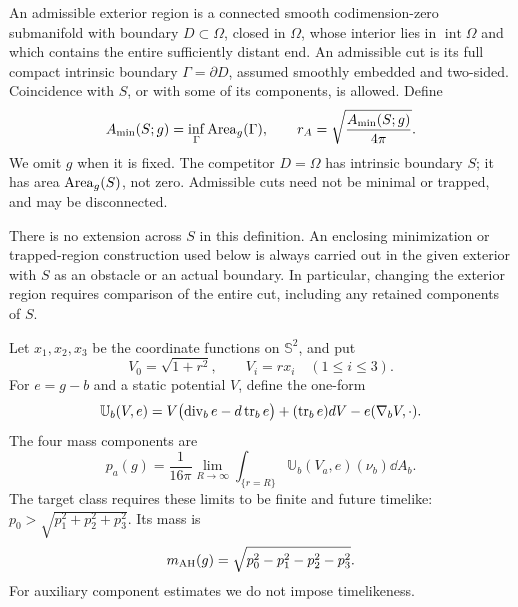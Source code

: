 \begin{definition}\label{def:setup-cut}
An admissible exterior region is a connected smooth codimension-zero
submanifold with boundary $D\subset\Omega$, closed in $\Omega$, whose
interior lies in $\operatorname{int}\Omega$ and which contains the entire
sufficiently distant end. An admissible cut is its full compact intrinsic
boundary $\Gamma=\partial D$, assumed smoothly embedded and two-sided.
Coincidence with $S$, or with some of its components, is allowed. Define
\begin{equation}\label{eq:setup-area}
 A_{\min}(S;g)=\inf_{\Gamma}\operatorname{Area}_g(\Gamma),
 \qquad r_A=\sqrt{\frac{A_{\min}(S;g)}{4\pi}}.
\end{equation}
We omit $g$ when it is fixed. The competitor $D=\Omega$ has intrinsic
boundary $S$; it has area $\operatorname{Area}_g(S)$, not zero. Admissible cuts need not be
minimal or trapped, and may be disconnected.
\end{definition}

There is no extension across $S$ in this definition. An enclosing
minimization or trapped-region construction used below is always carried
out in the given exterior with $S$ as an obstacle or an actual boundary.
In particular, changing the exterior region requires comparison of the
entire cut, including any retained components of $S$.

\begin{definition}\label{def:setup-mass}
Let $x_1,x_2,x_3$ be the coordinate functions on $\mathbb S^2$, and put
\begin{equation}\label{eq:setup-potentials}
 V_0=\sqrt{1+r^2},\qquad V_i=rx_i\quad(1\le i\le3).
\end{equation}
For $e=g-b$ and a static potential $V$, define the one-form
\begin{equation}\label{eq:setup-flux-form}
 \mathbb U_b(V,e)
 =V\bigl(\operatorname{div}_b e-d\operatorname{tr}_be\bigr)
    +(\operatorname{tr}_be)dV-e(\nabla_bV,\cdot).
\end{equation}
The four mass components are
\begin{equation}\label{eq:setup-flux}
 p_a(g)=\frac1{16\pi}\lim_{R\to\infty}
   \int_{\{r=R\}}\mathbb U_b(V_a,e)(\nu_b)\dd A_b.
\end{equation}
The target class requires these limits to be finite and future timelike:
$p_0>\sqrt{p_1^2+p_2^2+p_3^2}$. Its mass is
\begin{equation}\label{eq:setup-invariant-mass}
 m_{\mathrm{AH}}(g)=\sqrt{p_0^2-p_1^2-p_2^2-p_3^2}.
\end{equation}
For auxiliary component estimates we do not impose timelikeness.
\end{definition}

